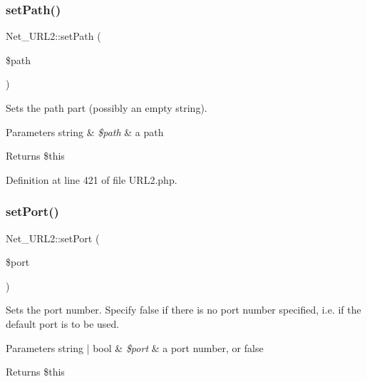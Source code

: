 \hypertarget{classNet__URL2_aa893e3c250be4842cf21dc6aed0f46b0}{}\label{classNet__URL2_aa893e3c250be4842cf21dc6aed0f46b0} 
\subsubsection{\texorpdfstring{set\+Path()}{setPath()}}
{\footnotesize\ttfamily Net\+\_\+\+U\+R\+L2\+::set\+Path (\begin{DoxyParamCaption}\item[{}]{\$path }\end{DoxyParamCaption})}

Sets the path part (possibly an empty string).


\begin{DoxyParams}[1]{Parameters}
string & {\em \$path} & a path\\
\hline
\end{DoxyParams}
\begin{DoxyReturn}{Returns}
\$this 
\end{DoxyReturn}


Definition at line 421 of file U\+R\+L2.\+php.

\hypertarget{classNet__URL2_a4086e17a9dc2744b451ed0e5cc6fe113}{}\label{classNet__URL2_a4086e17a9dc2744b451ed0e5cc6fe113} 
\subsubsection{\texorpdfstring{set\+Port()}{setPort()}}
{\footnotesize\ttfamily Net\+\_\+\+U\+R\+L2\+::set\+Port (\begin{DoxyParamCaption}\item[{}]{\$port }\end{DoxyParamCaption})}

Sets the port number. Specify false if there is no port number specified, i.\+e. if the default port is to be used.


\begin{DoxyParams}[1]{Parameters}
string | bool & {\em \$port} & a port number, or false\\
\hline
\end{DoxyParams}
\begin{DoxyReturn}{Returns}
\$this 
\end{DoxyReturn}


